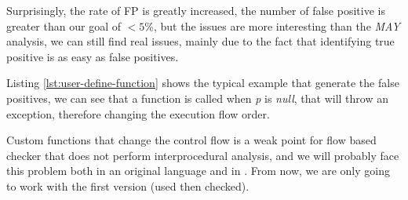 Surprisingly, the rate of FP is greatly increased, the number of false positive is greater than our goal of $<5\%$, but the issues are more interesting than the \emph{MAY} analysis, we can still find real issues, mainly due to the fact that identifying true positive is as easy as false positives.

 

Listing \ref{lst:user-define-function} shows the typical example that generate the false positives, we can see that a function is called when \emph{p} is \emph{null}, that will throw an exception, therefore changing the execution flow order.

Custom functions that change the control flow is a weak point for flow based checker that does not perform interprocedural analysis, and we will probably face this problem both in an original language and in \slang{}. From now, we are only going to work with the first version (used then checked).




